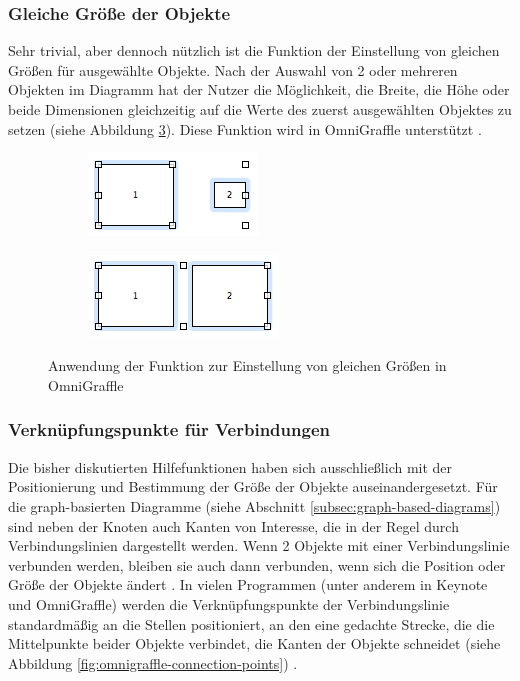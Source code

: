 \subsubsection{Gleiche Größe der Objekte}

Sehr trivial, aber dennoch nützlich ist die Funktion der Einstellung von gleichen Größen für ausgewählte Objekte. Nach der Auswahl von 2 oder mehreren Objekten im Diagramm hat der Nutzer die Möglichkeit, die Breite, die Höhe oder beide Dimensionen gleichzeitig auf die Werte des zuerst ausgewählten Objektes zu setzen (siehe Abbildung \ref{fig:omnigraffle-make-same-size}). Diese Funktion wird in OmniGraffle unterstützt \cite{Olsen10OmniGraffle}.

\begin{figure}[hbt]
    \newcommand{\subfigurewidth}{0.5\textwidth}
    \begin{subfigure}{\subfigurewidth}
        \centering
        \includegraphics{resources/omnigraffle-make-same-size-a}
        \caption{}
        \label{fig:omnigraffle-make-same-size-a}
    \end{subfigure}
    \begin{subfigure}{\subfigurewidth}
        \centering
        \includegraphics{resources/omnigraffle-make-same-size-b}
        \caption{}
        \label{fig:omnigraffle-make-same-size-b}
    \end{subfigure}
    \caption{Anwendung der Funktion zur Einstellung von gleichen Größen in OmniGraffle}
    \label{fig:omnigraffle-make-same-size}
\end{figure}

\subsubsection{Verknüpfungspunkte für Verbindungen}

Die bisher diskutierten Hilfefunktionen haben sich ausschließlich mit der Positionierung und Bestimmung der Größe der Objekte auseinandergesetzt. Für die graph-basierten Diagramme (siehe Abschnitt \ref{subsec:graph-based-diagrams}) sind neben der Knoten auch Kanten von Interesse, die in der Regel durch Verbindungslinien dargestellt werden. Wenn 2 Objekte mit einer Verbindungslinie verbunden werden, bleiben sie auch dann verbunden, wenn sich die Position oder Größe der Objekte ändert \cite{11Keynote}. In vielen Programmen (unter anderem in Keynote und OmniGraffle) werden die Verknüpfungspunkte der Verbindungslinie standardmäßig an die Stellen positioniert, an den eine gedachte Strecke, die die Mittelpunkte beider Objekte verbindet, die Kanten der Objekte schneidet (siehe Abbildung \ref{fig:omnigraffle-connection-points}) \cite{08OmniGraffle}.


